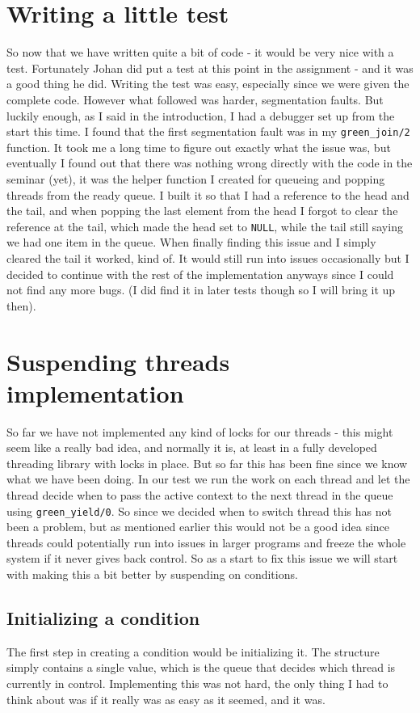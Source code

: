 \documentclass[a4paper, 12pt]{article}
\def\code#1{\texttt{#1}}
\begin{document}
\section{Writing a little test}
So now that we have written quite a bit of code - it would be very nice with a test. Fortunately Johan did put a test at this point in the assignment - and it was a good thing he did. Writing the test was easy, especially since we were given the complete code. However what followed was harder, segmentation faults. But luckily enough, as I said in the introduction,  I had a debugger set up from the start this time. I found that the first segmentation fault was in my \code{green\_join/2} function. It took me a long time to figure out exactly what the issue was, but eventually I found out that there was nothing wrong directly with the code in the seminar (yet), it was the helper function I created for queueing and popping threads from the ready queue. I built it so that I had a reference to the head and the tail, and when popping the last element from the head I forgot to clear the reference at the tail, which made the head set to \code{NULL}, while the tail still saying we had one item in the queue. When finally finding this issue and I simply cleared the tail it worked, kind of. It would still run into issues occasionally but I decided to continue with the rest of the implementation anyways since I could not find any more bugs. (I did find it in later tests though so I will bring it up then).

\section{Suspending threads implementation}
So far we have not implemented any kind of locks for our threads - this might seem like a really bad idea, and normally it is, at least in a fully developed threading library with locks in place. But so far this has been fine since we know what we have been doing. In our test we run the work on each thread and let the thread decide when to pass the active context to the next thread in the queue using \code{green\_yield/0}. So since we decided when to switch thread this has not been a problem, but as mentioned earlier this would not be a good idea since threads could potentially run into issues in larger programs and freeze the whole system if it never gives back control. So as a start to fix this issue we will start with making this a bit better by suspending on conditions.

\subsection{Initializing a condition}
The first step in creating a condition would be initializing it. The structure simply contains a single value, which is the queue that decides which thread is currently in control. Implementing this was not hard, the only thing I had to think about was if it really was as easy as it seemed, and it was.
\end{document}
